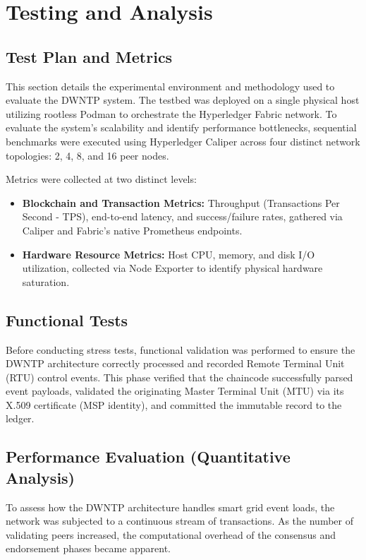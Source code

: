 \chapter{Testing and Analysis}
\label{chp:testing}

\section{Test Plan and Metrics}
This section details the experimental environment and methodology used to evaluate the DWNTP system. The testbed was deployed on a single physical host utilizing rootless Podman to orchestrate the Hyperledger Fabric network. To evaluate the system's scalability and identify performance bottlenecks, sequential benchmarks were executed using Hyperledger Caliper across four distinct network topologies: 2, 4, 8, and 16 peer nodes.

Metrics were collected at two distinct levels:
\begin{itemize}
    \item \textbf{Blockchain and Transaction Metrics:} Throughput (Transactions Per Second - TPS), end-to-end latency, and success/failure rates, gathered via Caliper and Fabric's native Prometheus endpoints.
    \item \textbf{Hardware Resource Metrics:} Host CPU, memory, and disk I/O utilization, collected via Node Exporter to identify physical hardware saturation.
\end{itemize}

\section{Functional Tests}
Before conducting stress tests, functional validation was performed to ensure the DWNTP architecture correctly processed and recorded Remote Terminal Unit (RTU) control events. This phase verified that the chaincode successfully parsed event payloads, validated the originating Master Terminal Unit (MTU) via its X.509 certificate (MSP identity), and committed the immutable record to the ledger.


\section{Performance Evaluation (Quantitative Analysis)}
To assess how the DWNTP architecture handles smart grid event loads, the network was subjected to a continuous stream of transactions. As the number of validating peers increased, the computational overhead of the consensus and endorsement phases became apparent.

